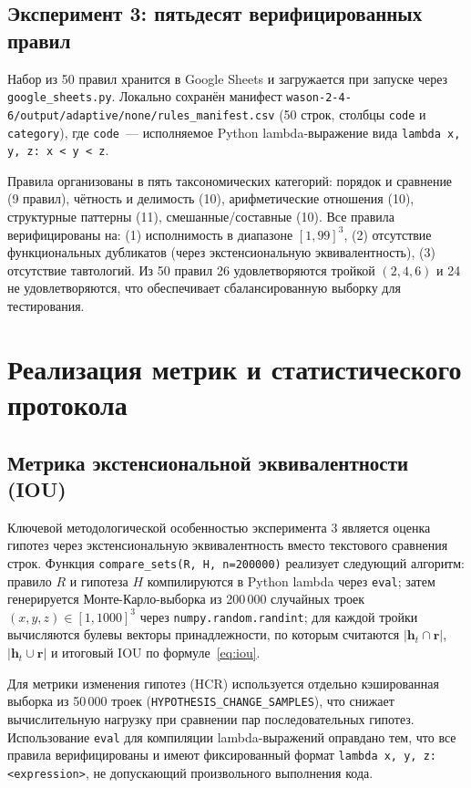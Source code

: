 \subsection{Эксперимент 3: пятьдесят верифицированных правил}

Набор из 50 правил хранится в Google Sheets и загружается при запуске через \texttt{google\_sheets.py}. Локально сохранён манифест \texttt{wason-2-4-6/output/adaptive/none/rules\_manifest.csv} (50 строк, столбцы \texttt{code} и \texttt{category}), где \texttt{code}~--- исполняемое Python lambda-выражение вида \texttt{lambda x, y, z: x < y < z}.

Правила организованы в пять таксономических категорий: порядок и сравнение (9 правил), чётность и делимость (10), арифметические отношения (10), структурные паттерны (11), смешанные/составные (10). Все правила верифицированы на: (1) исполнимость в диапазоне $[1, 99]^3$, (2) отсутствие функциональных дубликатов (через экстенсиональную эквивалентность), (3) отсутствие тавтологий. Из 50 правил 26 удовлетворяются тройкой $(2, 4, 6)$ и 24 не удовлетворяются, что обеспечивает сбалансированную выборку для тестирования.

\section{Реализация метрик и статистического протокола}

\subsection{Метрика экстенсиональной эквивалентности (IOU)}

Ключевой методологической особенностью эксперимента 3 является оценка гипотез через экстенсиональную эквивалентность вместо текстового сравнения строк. Функция \texttt{compare\_sets(R, H, n=200000)} реализует следующий алгоритм: правило $R$ и гипотеза $H$ компилируются в Python lambda через \texttt{eval}; затем генерируется Монте-Карло-выборка из 200\,000 случайных троек $(x, y, z) \in [1, 1000]^3$ через \texttt{numpy.random.randint}; для каждой тройки вычисляются булевы векторы принадлежности, по которым считаются $|\mathbf{h}_t \cap \mathbf{r}|$, $|\mathbf{h}_t \cup \mathbf{r}|$ и итоговый IOU по формуле~\eqref{eq:iou}.

Для метрики изменения гипотез (HCR) используется отдельно кэшированная выборка из 50\,000 троек (\texttt{HYPOTHESIS\_CHANGE\_SAMPLES}), что снижает вычислительную нагрузку при сравнении пар последовательных гипотез. Использование \texttt{eval} для компиляции lambda-выражений оправдано тем, что все правила верифицированы и имеют фиксированный формат \texttt{lambda x, y, z: <expression>}, не допускающий произвольного выполнения кода.


